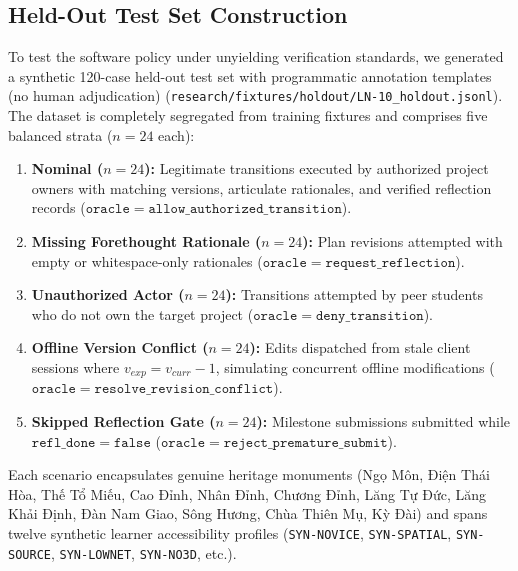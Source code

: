 \documentclass[11pt,a4paper]{article}
\begin{document}
\subsection{Held-Out Test Set Construction}
To test the software policy under unyielding verification standards, we generated a synthetic 120-case held-out test set with programmatic annotation templates (no human adjudication) (\texttt{research/fixtures/holdout/LN-10\_holdout.jsonl}). The dataset is completely segregated from training fixtures and comprises five balanced strata ($n=24$ each):
\begin{enumerate}
    \item \textbf{Nominal ($n=24$):} Legitimate transitions executed by authorized project owners with matching versions, articulate rationales, and verified reflection records ($\mathtt{oracle} = \mathtt{allow\_authorized\_transition}$).
    \item \textbf{Missing Forethought Rationale ($n=24$):} Plan revisions attempted with empty or whitespace-only rationales ($\mathtt{oracle} = \mathtt{request\_reflection}$).
    \item \textbf{Unauthorized Actor ($n=24$):} Transitions attempted by peer students who do not own the target project ($\mathtt{oracle} = \mathtt{deny\_transition}$).
    \item \textbf{Offline Version Conflict ($n=24$):} Edits dispatched from stale client sessions where $v_{exp} = v_{curr} - 1$, simulating concurrent offline modifications ($\mathtt{oracle} = \mathtt{resolve\_revision\_conflict}$).
    \item \textbf{Skipped Reflection Gate ($n=24$):} Milestone submissions submitted while $\mathtt{refl\_done} = \mathtt{false}$ ($\mathtt{oracle} = \mathtt{reject\_premature\_submit}$).
\end{enumerate}

Each scenario encapsulates genuine heritage monuments (Ngọ Môn, Điện Thái Hòa, Thế Tổ Miếu, Cao Đỉnh, Nhân Đỉnh, Chương Đỉnh, Lăng Tự Đức, Lăng Khải Định, Đàn Nam Giao, Sông Hương, Chùa Thiên Mụ, Kỳ Đài) and spans twelve synthetic learner accessibility profiles (\texttt{SYN-NOVICE}, \texttt{SYN-SPATIAL}, \texttt{SYN-SOURCE}, \texttt{SYN-LOWNET}, \texttt{SYN-NO3D}, etc.).
\end{document}
